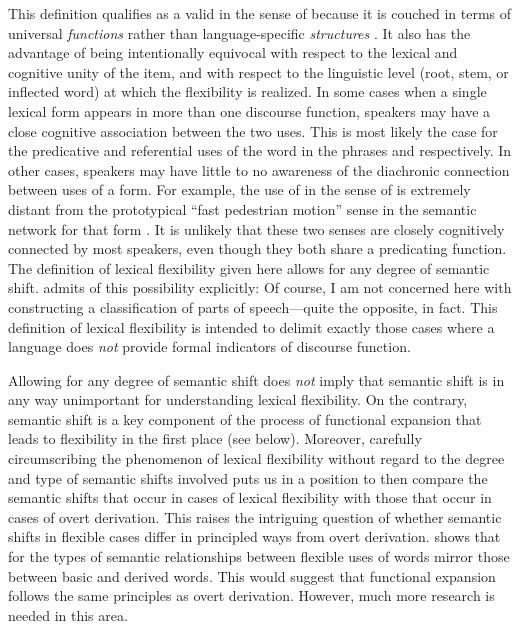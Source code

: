 This definition qualifies as a valid  in the sense of \textcite{Haspelmath2010a} because it is couched in terms of universal \emph{functions} rather than language-specific \emph{structures} \parencite{Croft2016}. It also has the advantage of being intentionally equivocal with respect to the lexical and cognitive unity of the item, and with respect to the linguistic level (root, stem, or inflected word) at which the flexibility is realized. In some cases when a single lexical form appears in more than one discourse function, speakers may have a close cognitive association between the two uses. This is most likely the case for the predicative and referential uses of the word  in the phrases  and  respectively. In other cases, speakers may have little to no awareness of the diachronic connection between uses of a form. For example, the use of  in the sense of  is extremely distant from the prototypical \enquote{fast pedestrian motion} sense in the semantic network for that form . It is unlikely that these two senses are closely cognitively connected by most speakers, even though they both share a predicating function. The definition of lexical flexibility given here allows for any degree of semantic shift. \citeauthor{Croft2001b} admits of this possibility explicitly:  Of course, I am not concerned here with constructing a classification of parts of speech—quite the opposite, in fact. This definition of lexical flexibility is intended to delimit exactly those cases where a language does \emph{not} provide formal indicators of discourse function.

Allowing for any degree of semantic shift does \emph{not} imply that semantic shift is in any way unimportant for understanding lexical flexibility. On the contrary, semantic shift is a key component of the process of functional expansion that leads to flexibility in the first place (see below). Moreover, carefully circumscribing the phenomenon of lexical flexibility without regard to the degree and type of semantic shifts involved puts us in a position to then compare the semantic shifts that occur in cases of lexical flexibility with those that occur in cases of overt derivation. This raises the intriguing question of whether semantic shifts in flexible cases differ in principled ways from overt derivation. \textcite[165]{Mithun2017} shows that for  the types of semantic relationships between flexible uses of words mirror those between basic and derived words. This would suggest that functional expansion follows the same principles as overt derivation. However, much more research is needed in this area.

